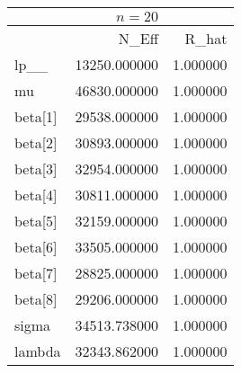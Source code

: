 \begin{tabular}{lrr}
& $ n = 20 $ & \\
\toprule
 & N\_Eff & R\_hat \\
\midrule
lp\_\_ & 13250.000000 & 1.000000 \\
mu & 46830.000000 & 1.000000 \\
beta[1] & 29538.000000 & 1.000000 \\
beta[2] & 30893.000000 & 1.000000 \\
beta[3] & 32954.000000 & 1.000000 \\
beta[4] & 30811.000000 & 1.000000 \\
beta[5] & 32159.000000 & 1.000000 \\
beta[6] & 33505.000000 & 1.000000 \\
beta[7] & 28825.000000 & 1.000000 \\
beta[8] & 29206.000000 & 1.000000 \\
sigma & 34513.738000 & 1.000000 \\
lambda & 32343.862000 & 1.000000 \\
\bottomrule
\end{tabular}
